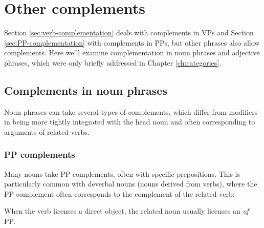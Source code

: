 \ea
    \z
\z{}

\section{Other complements}

Section \ref{sec:verb-complementation} deals with complements in VPs and Section \ref{sec:PP-complementation} with complements in PPs, but other phrases also allow complements. Here we'll examine complementation in noun phrases and adjective phrases, which were only briefly addressed in Chapter \ref{ch:categories}.

\subsection{Complements in noun phrases}

Noun phrases can take several types of complements, which differ from modifiers in being more tightly integrated with the head noun and often corresponding to arguments of related verbs.

\subsubsection{PP complements}

Many nouns take PP complements, often with specific prepositions. This is particularly common with deverbal nouns (nouns derived from verbs), where the PP complement often corresponds to the complement of the related verb:

\ea
    \z
\z

\noindent When the verb licenses a direct object, the related noun usually licenses an \textit{of} PP.

